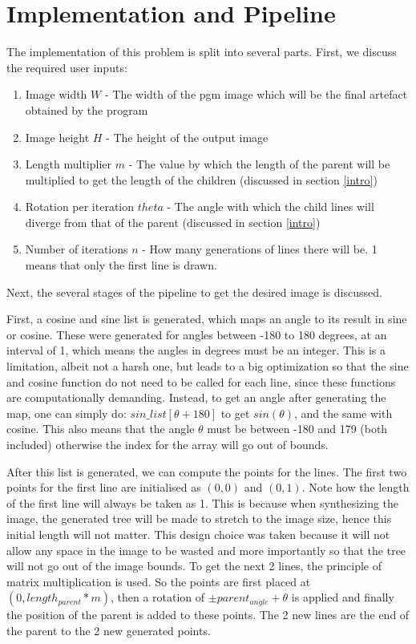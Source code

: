\section{Implementation and Pipeline}
The implementation of this problem is split into several parts. First, we discuss the required user inputs:
\begin{enumerate}
	\item Image width $W$ - The width of the pgm image which will be the final artefact obtained by the program
	\item Image height $H$ - The height of the output image
	\item Length multiplier $m$ - The value by which the length of the parent will be multiplied to get the length of the children (discussed in section \ref{intro})
	\item Rotation per iteration $theta$ - The angle with which the child lines will diverge from that of the parent (discussed in section \ref{intro})
	\item Number of iterations $n$ - How many generations of lines there will be. 1 means that only the first line is drawn.
\end{enumerate}
Next, the several stages of the pipeline to get the desired image is discussed.

First, a cosine and sine list is generated, which maps an angle to its result in sine or cosine. These were generated for angles between -180 to 180 degrees, at an interval of 1, which means the angles in degrees must be an integer. This is a limitation, albeit not a harsh one, but leads to a big optimization so that the sine and cosine function do not need to be called for each line, since these functions are computationally demanding. Instead, to get an angle after generating the map, one can simply do: $sin\_list[\theta + 180]$ to get $sin(\theta)$, and the same with cosine. This also means that the angle $\theta$ must be between -180 and 179 (both included) otherwise the index for the array will go out of bounds.

After this list is generated, we can compute the points for the lines. The first two points for the first line are initialised as $(0, 0)$ and $(0, 1)$. Note how the length of the first line will always be taken as 1. This is because when synthesizing the image, the generated tree will be made to stretch to the image size, hence this initial length will not matter. This design choice was taken because it will not allow any space in the image to be wasted and more importantly so that the tree will not go out of the image bounds. To get the next 2 lines, the principle of matrix multiplication is used. So the points are first placed at $(0, length_{parent} * m)$, then a rotation of $\pm parent_{angle} + \theta$ is applied and finally the position of the parent is added to these points. The 2 new lines are the end of the parent to the 2 new generated points.

